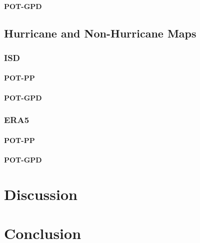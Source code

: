 \documentclass[12pt,oneside]{reedthesis}
\begin{document}
\hypertarget{pot-gpd-2}{%
\subsubsection{POT-GPD}\label{pot-gpd-2}}

\hypertarget{hurricane-and-non-hurricane-maps}{%
\section{Hurricane and Non-Hurricane Maps}\label{hurricane-and-non-hurricane-maps}}

\hypertarget{isd-2}{%
\subsection{ISD}\label{isd-2}}

\hypertarget{pot-pp-3}{%
\subsubsection{POT-PP}\label{pot-pp-3}}

\hypertarget{pot-gpd-3}{%
\subsubsection{POT-GPD}\label{pot-gpd-3}}

\hypertarget{era5-2}{%
\subsection{ERA5}\label{era5-2}}

\hypertarget{pot-pp-4}{%
\subsubsection{POT-PP}\label{pot-pp-4}}

\hypertarget{pot-gpd-4}{%
\subsubsection{POT-GPD}\label{pot-gpd-4}}

\hypertarget{rmd-discussion}{%
\chapter{Discussion}\label{rmd-discussion}}

\hypertarget{conclusion}{%
\chapter*{Conclusion}\label{conclusion}}
\end{document}
